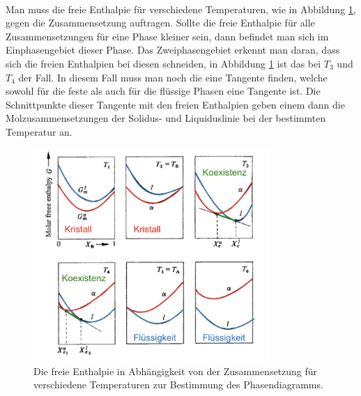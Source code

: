 \documentclass[11pt,a4paper]{article}
\numberwithin{equation}{section}
\numberwithin{figure}{section}
\begin{document}
\\
\begin{addmargin}[25pt]{0pt}
Man muss die freie Enthalpie für verschiedene Temperaturen, wie in Abbildung \ref{fig:Mischungsenthalpie_Phasendiagramm}, gegen die Zusammensetzung auftragen. Sollte die freie Enthalpie für alle Zusammensetzungen für eine Phase kleiner sein, dann befindet man sich im Einphasengebiet dieser Phase. Das Zweiphasengebiet erkennt man daran, dass sich die freien Enthalpien bei diesen schneiden, in Abbildung \ref{fig:Mischungsenthalpie_Phasendiagramm} ist das bei $T_3$ und $T_4$ der Fall. In diesem Fall muss man noch die eine Tangente finden, welche sowohl für die feste als auch für die flüssige Phasen eine Tangente ist. Die Schnittpunkte dieser Tangente mit den freien Enthalpien geben einem dann die Molzusammensetzungen der Solidus- und Liquiduslinie bei der bestimmten Temperatur an.\\
\begin{figure}[h]
    \centering
    \includegraphics[width = 0.8\textwidth]{images/Materialwissenschaften/Mischungsenthalpie_Phasendiagramm.jpeg}
    \caption{Die freie Enthalpie in Abhängigkeit von der Zusammensetzung für verschiedene Temperaturen zur Bestimmung des Phasendiagramms.}
    \label{fig:Mischungsenthalpie_Phasendiagramm}
\end{figure}
\end{addmargin}
\end{document}
